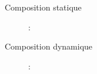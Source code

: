       \SpecialItem
      \begin{description}
      \item[Composition statique] :



      \item[Composition dynamique] :



\end{description}

